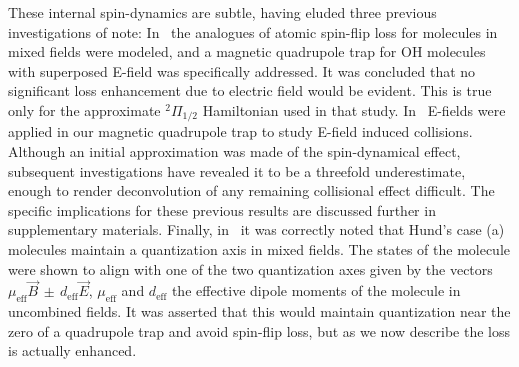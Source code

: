\documentclass[%
 reprint,
 amsmath,amssymb,
 aps,
prl,
]{revtex4-1}
\begin{document}
These internal spin-dynamics are subtle, having eluded three previous investigations of note: In~\cite{Lara2008} the analogues of atomic spin-flip loss for molecules in mixed fields were modeled, and a magnetic quadrupole trap for OH molecules with superposed E-field was specifically addressed. 
It was concluded that no significant loss enhancement due to electric field would be evident. 
This is true only for the approximate $^2\Pi_{1/2}$ Hamiltonian used in that study. 
In~\cite{Stuhl2013} E-fields were applied in our magnetic quadrupole trap to study E-field induced collisions. 
Although an initial approximation was made of the spin-dynamical effect, subsequent investigations have revealed it to be a threefold underestimate, enough to render deconvolution of any remaining collisional effect difficult.
The specific implications for these previous results are discussed further in supplementary materials.
Finally, in~\cite{Bohn2013} it was correctly noted that Hund's case (a) molecules maintain a quantization axis in mixed fields. 
The states of the molecule were shown to align with one of the two quantization axes given by the vectors $\mu_\text{eff}\vec{B}\,{\pm}\, d_\text{eff}\vec{E}$, $\mu_\text{eff}$ and $d_\text{eff}$ the effective dipole moments of the molecule in uncombined fields. 
It was asserted that this would maintain quantization near the zero of a quadrupole trap and avoid spin-flip loss, but as we now describe the loss is actually enhanced.

\end{document}
